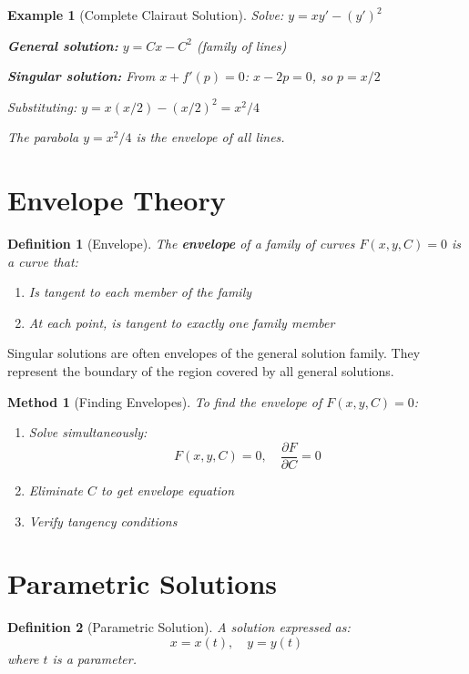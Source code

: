 \documentclass[12pt]{article}
\newtheorem{definition}{Definition}
\newtheorem{method}{Method}
\newtheorem{example}{Example}
\begin{document}
\begin{example}[Complete Clairaut Solution]
Solve: $y = xy' - (y')^2$

\textbf{General solution:} $y = Cx - C^2$ (family of lines)

\textbf{Singular solution:}
From $x + f'(p) = 0$: $x - 2p = 0$, so $p = x/2$

Substituting: $y = x(x/2) - (x/2)^2 = x^2/4$

The parabola $y = x^2/4$ is the envelope of all lines.
\end{example}

\section{Envelope Theory}

\begin{definition}[Envelope]
The \textbf{envelope} of a family of curves $F(x,y,C) = 0$ is a curve that:
\begin{enumerate}
    \item Is tangent to each member of the family
    \item At each point, is tangent to exactly one family member
\end{enumerate}
\end{definition}

\begin{insight}
Singular solutions are often envelopes of the general solution family. They represent the boundary of the region covered by all general solutions.
\end{insight}

\begin{method}[Finding Envelopes]
To find the envelope of $F(x,y,C) = 0$:
\begin{enumerate}
    \item Solve simultaneously:
    $$F(x,y,C) = 0, \quad \frac{\partial F}{\partial C} = 0$$
    \item Eliminate $C$ to get envelope equation
    \item Verify tangency conditions
\end{enumerate}
\end{method}

\section{Parametric Solutions}

\begin{definition}[Parametric Solution]
A solution expressed as:
$$x = x(t), \quad y = y(t)$$
where $t$ is a parameter.
\end{definition}
\end{document}
